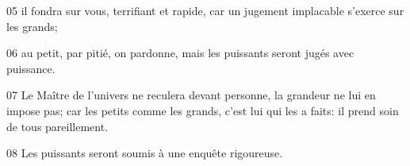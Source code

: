 05 il fondra sur vous, terrifiant et rapide, car un jugement implacable s’exerce sur les grands;

06 au petit, par pitié, on pardonne, mais les puissants seront jugés avec puissance.

07 Le Maître de l’univers ne reculera devant personne, la grandeur ne lui en impose pas; car les petits comme les grands, c’est lui qui les a faits: il prend soin de tous pareillement.

08 Les puissants seront soumis à une enquête rigoureuse.

